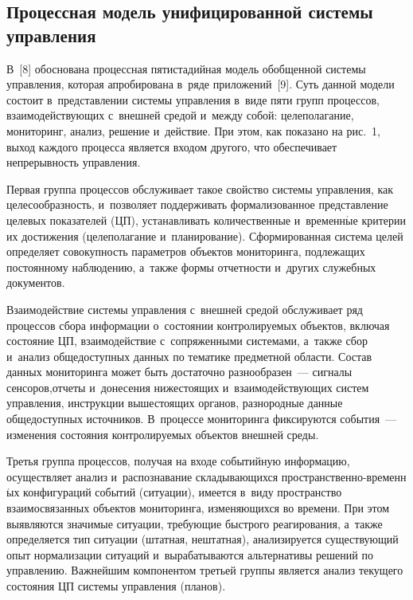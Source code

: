 \begin{multicols}{2}
    
\section{Процессная модель унифицированной системы 
управления}

\vspace*{-8pt}

    В~[8] обоснована процессная пятистадийная модель обобщенной 
системы управления, которая апробирована в~ряде приложений~[9]. Суть 
данной модели со\-сто\-ит в~представлении сис\-те\-мы управ\-ле\-ния в~виде пяти 
групп процессов, вза\-и\-мо\-дей\-ст\-ву\-ющих с~внешней средой и~между собой: 
целеполагание, мониторинг, анализ, решение и~действие. При этом, как 
показано на рис.~1,  выход каждого процесса является входом другого, что 
обеспечивает непрерывность управ\-ле\-ния. 
    
    Первая группа процессов обслуживает такое свойство системы 
управления, как целесообразность, и~позволяет поддерживать 
формализованное представление целевых показателей (ЦП), устанавливать 
количественные и~временн$\acute{\mbox{ы}}$е критерии их достижения (целеполагание 
и~планирование). Сформированная сис\-те\-ма целей определяет со\-во\-куп\-ность 
па\-ра\-мет\-ров объектов мониторинга, подлежащих постоянному наблюдению, 
а~также формы отчетности и~других служебных документов. 
    
    Взаимодействие системы управления с~внешней средой обслуживает ряд 
процессов сбора информации о~со\-сто\-янии контролируемых объектов, 
включая со\-сто\-яние ЦП, взаимодействие с~сопряженными сис\-те\-ма\-ми, а~также 
сбор и~анализ общедоступных данных по тематике предметной об\-ласти. 
Состав данных мониторинга может быть достаточно разнообразен~--- 
сигналы сенсоров,\linebreak отчеты и~донесения нижестоящих и~вза\-имо\-действующих 
сис\-тем управ\-ле\-ния, инструкции вышесто\-ящих органов, разнородные данные 
общедоступных источников. В~процессе мониторинга фиксируются 
события~--- изменения со\-сто\-яния контролируемых объектов внешней среды.
    

    
    Третья группа процессов, получая на входе событийную информацию, 
осуществляет анализ и~распознавание скла\-ды\-ва\-ющих\-ся 
про\-стран\-ст\-вен\-но-вре\-мен\-н$\acute{\mbox{ы}}$х конфигураций событий (ситуации), имеется в~виду пространство 
взаимосвязанных объектов мониторинга, изменяющихся во времени. При 
этом выявляются значимые ситуации, тре\-бу\-ющие быст\-ро\-го реагирования, 
а~также определяется тип ситуации (штатная, нештатная), анализируется 
су\-ще\-ст\-ву\-ющий опыт нормализации ситуаций и~вырабатываются 
альтернативы решений по управ\-ле\-нию. Важнейшим компонентом третьей 
группы является анализ  текущего со\-сто\-яния  ЦП  сис\-те\-мы управ\-ле\-ния 
(планов).



\end{multicols}

